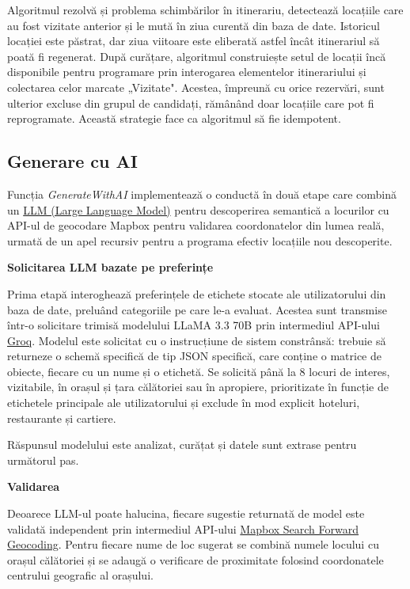 Algoritmul rezolvă și problema schimbărilor în itinerariu, detectează locațiile care au fost vizitate anterior și le mută în ziua curentă din baza de date. Istoricul locației este păstrat, dar ziua viitoare este eliberată astfel încât itinerariul să poată fi regenerat. După curățare, algoritmul construiește setul de locații încă disponibile pentru programare prin interogarea elementelor itinerariului și colectarea celor marcate „Vizitate". Acestea, împreună cu orice rezervări, sunt ulterior excluse din grupul de candidați, rămânând doar locațiile care pot fi reprogramate. Această strategie face ca algoritmul să fie idempotent.

\subsection{Generare cu AI}
Funcția \textit{GenerateWithAI} implementează o conductă în două etape care combină un \href{https://journals.sagepub.com/doi/10.3233/FAIA241326}{LLM (Large Language Model)}\cite{recomandation_ref} pentru descoperirea semantică a locurilor cu API-ul de geocodare Mapbox pentru validarea coordonatelor din lumea reală, urmată de un apel recursiv pentru a programa efectiv locațiile nou descoperite.

\textbf{Solicitarea LLM bazate pe preferințe}

Prima etapă interoghează preferințele de etichete stocate ale utilizatorului din baza de date, preluând categoriile pe care le-a evaluat. Acestea sunt transmise într-o solicitare trimisă modelului LLaMA 3.3 70B prin intermediul API-ului \href{https://groq.com/}{Groq}\cite{groq_ref}. Modelul este solicitat cu o instrucțiune de sistem constrânsă: trebuie să returneze o schemă specifică de tip JSON specifică, care conține o matrice de obiecte, fiecare cu un nume și o etichetă. Se solicită până la 8 locuri de interes, vizitabile, în orașul și țara călătoriei sau în apropiere, prioritizate în funcție de etichetele principale ale utilizatorului și exclude în mod explicit hoteluri, restaurante și cartiere.

Răspunsul modelului este analizat, curățat și datele sunt extrase pentru următorul pas. 

\textbf{Validarea}

Deoarece LLM-ul poate halucina, fiecare sugestie returnată de model este validată independent prin intermediul API-ului \href{https://www.mapbox.com/geocoding}{Mapbox Search Forward Geocoding}\cite{mapbox_check_ref}. Pentru fiecare nume de loc sugerat se combină numele locului cu orașul călătoriei și se adaugă o verificare de proximitate folosind coordonatele centrului geografic al orașului.

